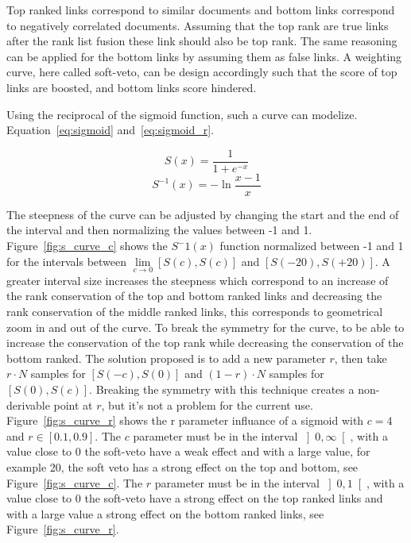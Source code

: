 Top ranked links correspond to similar documents and bottom links correspond to negatively correlated documents.
Assuming that the top rank are true links after the rank list fusion these link should also be top rank.
The same reasoning can be applied for the bottom links by assuming them as false links.
A weighting curve, here called soft-veto, can be design accordingly such that the score of top links are boosted, and bottom links score hindered.

Using the reciprocal of the sigmoid function, such a curve can modelize. Equation~\ref{eq:sigmoid} and~\ref{eq:sigmoid_r}.

\begin{equation}
  \label{eq:sigmoid}
  S(x) = \frac{1}{1+e^{-x}}
\end{equation}
\begin{equation}
  \label{eq:sigmoid_r}
  S^{-1}(x) = -\ln{\frac{x-1}{x}}
\end{equation}

The steepness of the curve can be adjusted by changing the start and the end of the interval and then normalizing the values between -1 and 1.
Figure~\ref{fig:s_curve_c} shows the $S^-1(x)$ function normalized between -1 and 1 for the intervals between $\lim\limits_{c \rightarrow 0} \left[S(c), S(c)\right]$ and $\left[S(-20), S(+20)\right]$.
A greater interval size increases the steepness which correspond to an increase of the rank conservation of the top and bottom ranked links and decreasing the rank conservation of the middle ranked links, this corresponds to geometrical zoom in and out of the curve.
To break the symmetry for the curve, to be able to increase the conservation of the top rank while decreasing the conservation of the bottom ranked.
The solution proposed is to add a new parameter $r$, then take $r \cdot N$ samples for $\left[S(-c), S(0)\right]$ and $(1-r) \cdot N$ samples for $\left[S(0), S(c)\right]$.
Breaking the symmetry with this technique creates a non-derivable point at $r$, but it's not a problem for the current use.
Figure~\ref{fig:s_curve_r} shows the r parameter influance of a sigmoid with $c = 4$ and $r \in \left[0.1, 0.9\right]$.
The $c$ parameter must be in the interval $\left]0, \infty\right[$, with a value close to $0$ the soft-veto have a weak effect and with a large value, for example 20, the soft veto has a strong effect on the top and bottom, see Figure~\ref{fig:s_curve_c}.
The $r$ parameter must be in the interval $\left]0, 1\right[$, with a value close to $0$ the soft-veto have a strong effect on the top ranked links and with a large value a strong effect on the bottom ranked links, see Figure~\ref{fig:s_curve_r}.


